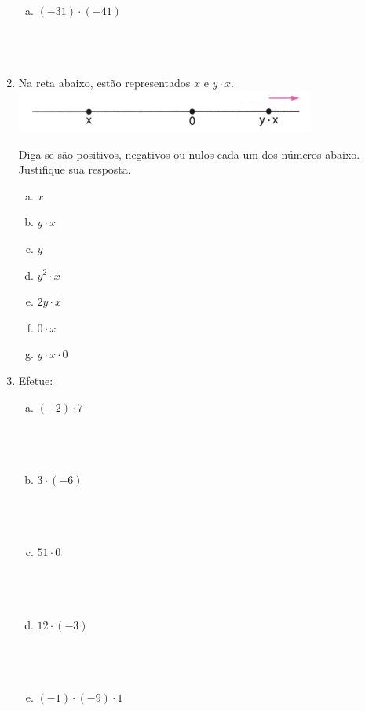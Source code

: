\documentclass[a4paper,14pt]{article}
\begin{document}
\begin{multicols}{2}
\begin{enumerate}
\begin{enumerate}[a)]
				\item $(-31) \cdot (-41)$ \\\\\\\\
			\end{enumerate}
			\item Na reta abaixo, estão representados $x$ e $y \cdot x$. \\
			\includegraphics[width=1\linewidth]{6FMA80_imagens/imagem1}
			
			Diga se são positivos, negativos ou nulos cada um dos números abaixo. Justifique sua resposta.
			\begin{enumerate}[a)]
				\item $x$
				\item $y \cdot x$
				\item $y$
				\item $y^2 \cdot x$
				\item $2y \cdot x$
				\item $0 \cdot x$
				\item $y \cdot x \cdot 0$
			\end{enumerate}
			\item Efetue:
			\begin{enumerate}[a)]
				\item $(-2) \cdot 7$ \\\\\\\\
				\item $3 \cdot (-6)$ \\\\\\\\
				\item $51 \cdot 0$ \\\\\\\\
				\item $12 \cdot (-3)$ \\\\\\\\
				\item $(-1) \cdot (-9) \cdot 1$ \\\\\\\\

\end{enumerate}
\end{enumerate}
\end{multicols}
\end{document}
